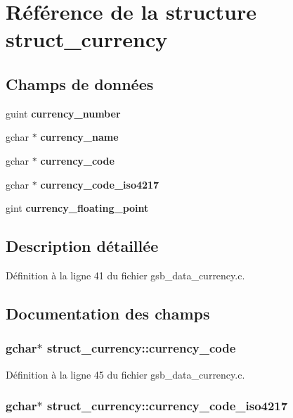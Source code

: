 \section{Référence de la structure struct\_\-currency}
\label{structstruct__currency}
\subsection*{Champs de données}
\begin{DoxyCompactItemize}
\item 
guint {\bf currency\_\-number}
\item 
gchar $\ast$ {\bf currency\_\-name}
\item 
gchar $\ast$ {\bf currency\_\-code}
\item 
gchar $\ast$ {\bf currency\_\-code\_\-iso4217}
\item 
gint {\bf currency\_\-floating\_\-point}
\end{DoxyCompactItemize}


\subsection{Description détaillée}


Définition à la ligne 41 du fichier gsb\_\-data\_\-currency.c.



\subsection{Documentation des champs}
\subsubsection[{currency\_\-code}]{\setlength{\rightskip}{0pt plus 5cm}gchar$\ast$ {\bf struct\_\-currency::currency\_\-code}}\label{structstruct__currency_a5e2262e99bbf9f203101fe8305630671}


Définition à la ligne 45 du fichier gsb\_\-data\_\-currency.c.

\subsubsection[{currency\_\-code\_\-iso4217}]{\setlength{\rightskip}{0pt plus 5cm}gchar$\ast$ {\bf struct\_\-currency::currency\_\-code\_\-iso4217}}\label{structstruct__currency_ac2e46ecaea578136122b482c2f7fe500}



